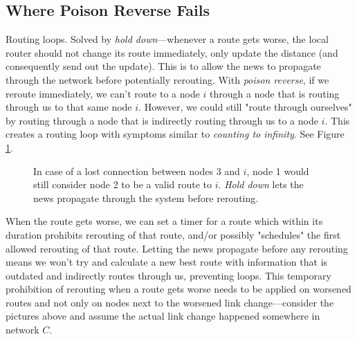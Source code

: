 \documentclass[10pt,a4paper]{article}
\begin{document}
\subsection{Where Poison Reverse Fails}
Routing loops. Solved by \emph{hold down}\cite{tcpip}---whenever a route gets worse, the local router should not change its route immediately, only update the distance (and consequently send out the update). This is to allow the news to propagate through the network before potentially rerouting. With \emph{poison reverse}, if we reroute immediately, we can't route to a node $i$ through a node that is routing through us to that same node $i$. However, we could still "route through ourselves" by routing through a node that is indirectly routing through us to a node $i$. This creates a routing loop with symptoms similar to \emph{counting to infinity}. See Figure \ref{pic1}.

\begin{figure}[h]
  \centering
  \caption{In case of a lost connection between nodes 3 and $i$, node 1 would still consider node 2 to be a valid route to $i$. \emph{Hold down} lets the news propagate through the system before rerouting.}
  \label{pic1}
\end{figure}







When the route gets worse, we can set a timer for a route which within its duration prohibits rerouting of that route, and/or possibly "schedules" the first allowed rerouting of that route. Letting the news propagate before any rerouting means we won't try and calculate a new best route with information that is outdated and indirectly routes through us, preventing loops. This temporary prohibition of rerouting when a route gets worse needs to be applied on worsened routes and not only on nodes next to the worsened link change---consider the pictures above and assume the actual link change happened somewhere in network $C$.


\end{document}
